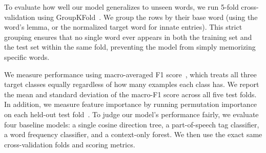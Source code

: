 \documentclass[sigconf]{acmart}
\begin{document}
To evaluate how well our model generalizes to unseen words, we run 5-fold cross-validation using GroupKFold~\cite{roberts2017cross}. We group the rows by their base word (using the word's lemma, or the normalized target word for innate entries). This strict grouping ensures that no single word ever appears in both the training set and the test set within the same fold, preventing the model from simply memorizing specific words.

We measure performance using macro-averaged F1
score~\cite{sokolova2009systematic}, which treats all three target
classes equally regardless of how many examples each class has. We report the mean and standard deviation of the macro-F1 score across all five test folds. In addition, we measure feature importance by running permutation importance on each held-out test fold~\cite{breiman2001random, fisher2019all}. To judge our model's performance fairly, we evaluate four baseline models: a single cosine direction tree, a part-of-speech tag classifier, a word frequency classifier, and a context-only forest. We then use the exact same cross-validation folds and scoring metrics.
\end{document}
